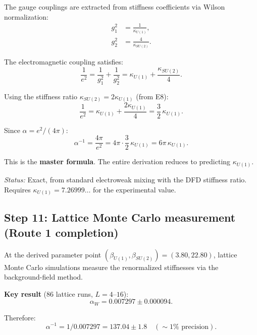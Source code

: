 \documentclass[12pt,a4paper]{article}
\begin{document}
The gauge couplings are extracted from stiffness coefficients via
Wilson normalization:
\begin{align}
g_1^2 &= \frac{1}{\kappa_{U(1)}}, \tag{E10a}\\
g_2^2 &= \frac{4}{\kappa_{SU(2)}}. \tag{E10b}
\end{align}

The electromagnetic coupling satisfies:
\begin{equation}\tag{E10c}
\frac{1}{e^2} = \frac{1}{g_1^2} + \frac{1}{g_2^2}
= \kappa_{U(1)} + \frac{\kappa_{SU(2)}}{4}.
\end{equation}

Using the stiffness ratio $\kappa_{SU(2)} = 2\kappa_{U(1)}$ (from E8):
\begin{equation}\tag{E10d}
\frac{1}{e^2} = \kappa_{U(1)} + \frac{2\kappa_{U(1)}}{4}
= \frac{3}{2}\,\kappa_{U(1)}.
\end{equation}

Since $\alpha = e^2/(4\pi)$:
\begin{equation}\tag{E10e}
\boxed{\alpha^{-1} = \frac{4\pi}{e^2} = 4\pi \cdot \frac{3}{2}\,\kappa_{U(1)}
= 6\pi\,\kappa_{U(1)}.}
\end{equation}

This is the \textbf{master formula}.  The entire derivation reduces to
predicting $\kappa_{U(1)}$.

\textit{Status:} Exact, from standard electroweak mixing with the DFD
stiffness ratio.  Requires $\kappa_{U(1)} = 7.26999\ldots$ for the
experimental value.

\subsection{Step 11: Lattice Monte Carlo measurement (Route 1 completion)}

At the derived parameter point $(\beta_{U(1)}, \beta_{SU(2)}) = (3.80, 22.80)$,
lattice Monte Carlo simulations measure the renormalized stiffnesses via the
background-field method.

\textbf{Key result} (86 lattice runs, $L = 4$--$16$):
\begin{equation}\tag{E11a}
\alpha_W = 0.007297 \pm 0.000094.
\end{equation}

Therefore:
\begin{equation}\tag{E11b}
\alpha^{-1} = 1/0.007297 = 137.04 \pm 1.8 \quad (\sim 1\%\text{ precision}).
\end{equation}
\end{document}
